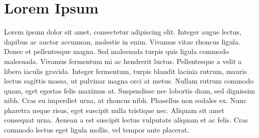 \documentclass{silicone}
\begin{document}
  
  
  \section*{Lorem Ipsum}
  Lorem ipsum dolor sit amet, consectetur adipiscing elit. Integer augue lectus, dapibus ac auctor accumsan, molestie in enim.
  Vivamus vitae rhoncus ligula. Donec et pellentesque magna. Sed malesuada turpis quis ligula commodo malesuada.
  Vivamus fermentum mi ac hendrerit luctus. Pellentesque a velit a libero iaculis gravida. Integer fermentum,
  turpis blandit lacinia rutrum, mauris lectus sagittis massa, ut pulvinar magna orci at metus. Nullam rutrum commodo quam, eget egestas felis maximus at.
  Suspendisse nec lobortis diam, sed dignissim nibh. Cras eu imperdiet urna, at rhoncus nibh. Phasellus non sodales ex. Nunc pharetra neque risus, eget 
  suscipit nulla tristique nec. Aliquam sit amet consequat urna. 
  Aenean a est suscipit lectus vulputate aliquam et ac felis. Cras commodo lectus eget ligula mollis, vel tempor ante placerat. 
  
\end{document}
